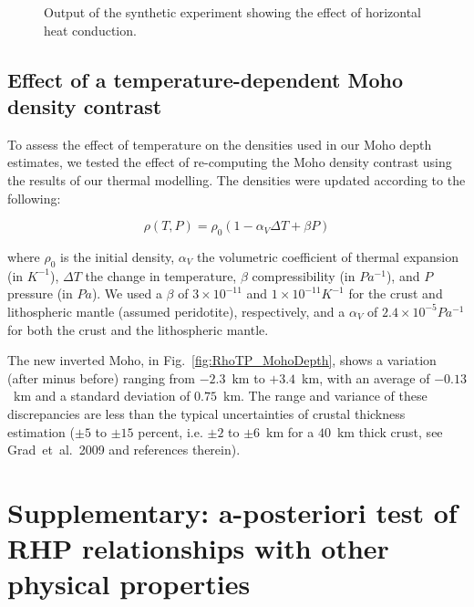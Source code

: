 {\begin{subappendices}
\begin{figure}
	\begin{adjustbox}{center}
	\end{adjustbox}
	\caption{Output of the synthetic experiment showing the effect of horizontal heat conduction.}
	\label{fig:2Deff}
\end{figure}

\FloatBarrier

\subsection{Effect of a temperature-dependent Moho density contrast}
\label{ss:ApplSup:MethodTests:MohoDeltaRho}

To assess the effect of temperature on the densities used in our Moho depth estimates, we tested the effect of re-computing the Moho density contrast using the results of our thermal modelling.
The densities were updated according to the following:

\begin{equation*}
    \rho(T,P) = \rho_0 (1 - \alpha_V \Delta T + \beta P) 
\end{equation*}

where $\rho_0$ is the initial density, $\alpha_V$ the volumetric coefficient of thermal expansion (in $K^{-1}$), $\Delta T$ the change in temperature, $\beta$ compressibility (in $Pa^{-1}$), and $P$ pressure (in $Pa$). We used a $\beta$ of $3 \times 10^{-11}$ and $1 \times 10^{-11} K^{-1}$ for the crust and lithospheric mantle (assumed peridotite), respectively, and a $\alpha_V$ of $2.4 \times 10^{-5} Pa^{-1}$ for both the crust and the lithospheric mantle.

The new inverted Moho, in Fig.~\ref{fig:RhoTP_MohoDepth}, shows a variation (after minus before) ranging from $-2.3$~km to $+3.4$~km, with an average of $-0.13$~km and a standard deviation of $0.75$~km. The range and variance of these discrepancies are less than the typical uncertainties of crustal thickness estimation ($\pm 5$ to $\pm 15$ percent, i.e. $\pm 2$ to $\pm 6$~km for a $40$~km thick crust, see Grad~et~al.~2009 and references therein).


\section[Supplementary:~a-posteriori test of RHP relationships with other physical properties]{Supplementary: a-posteriori test of RHP relationships with other physical properties}
\label{s:ApplSup:Rel}


\end{subappendices}}
